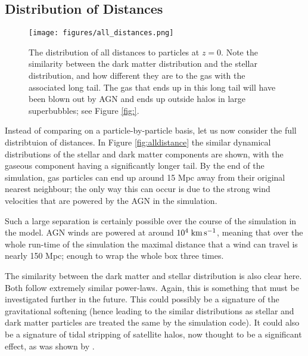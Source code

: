 \subsection{Distribution of Distances}

\begin{figure} \centering
	\texttt{[image: figures/all\_distances.png]}
	\caption{The distribution of all distances to particles at $z=0$. Note
	the similarity between the dark matter distribution and the stellar
	distribution, and how different they are to the gas with the associated
	long tail. The gas that ends up in this long tail will have been blown
	out by AGN and ends up outside halos in large superbubbles; see Figure
	\ref{fig:}.} \label{fig:alldistances}
\end{figure}

Instead of comparing on a particle-by-particle basis, let us now consider the
full distribtuion of distances. In Figure \ref{fig:alldistance} the similar
dynamical distributions of the stellar and dark matter components are shown,
with the gaseous component having a significantly longer tail. By the end of
the simulation, gas particles can end up around 15 Mpc away from their original
nearest neighbour; the only way this can occur is due to the strong wind
velocities that are powered by the AGN in the simulation.

Such a large separation is certainly possible over the course of the simulation
in the \simba{} model. AGN winds are powered at around $10^4 \;{\rm km}\,{\rm s}^{-1}{}$, meaning
that over the whole run-time of the simulation the maximal distance that
a wind can travel is nearly 150 Mpc; enough to wrap the whole box three times.

The similarity between the dark matter and stellar distribution is also clear
here. Both follow extremely similar power-laws. Again, this is something that
must be investigated further in the future. This could possibly be a signature
of the gravitational softening (hence leading to the similar distributions as
stellar and dark matter particles are treated the same by the simulation code).
It could also be a signature of tidal stripping of satellite halos, now thought
to be a significant effect, as was shown by \citet{vandenbosch2018}.

